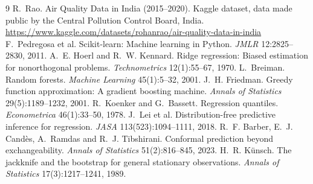 \documentclass{article}
\begin{document}
\begin{thebibliography}{9}
 R.~Rao. Air Quality Data in India (2015--2020). Kaggle dataset, data made public by the Central Pollution Control Board, India. \url{https://www.kaggle.com/datasets/rohanrao/air-quality-data-in-india}
 F.~Pedregosa et al. Scikit-learn: Machine learning in Python. \emph{JMLR} 12:2825--2830, 2011.
 A.~E. Hoerl and R.~W. Kennard. Ridge regression: Biased estimation for nonorthogonal problems. \emph{Technometrics} 12(1):55--67, 1970.
 L.~Breiman. Random forests. \emph{Machine Learning} 45(1):5--32, 2001.
 J.~H. Friedman. Greedy function approximation: A gradient boosting machine. \emph{Annals of Statistics} 29(5):1189--1232, 2001.
 R.~Koenker and G.~Bassett. Regression quantiles. \emph{Econometrica} 46(1):33--50, 1978.
 J.~Lei et al. Distribution-free predictive inference for regression. \emph{JASA} 113(523):1094--1111, 2018.
 R.~F. Barber, E.~J. Cand\`es, A.~Ramdas and R.~J. Tibshirani. Conformal prediction beyond exchangeability. \emph{Annals of Statistics} 51(2):816--845, 2023.
 H.~R. K\"unsch. The jackknife and the bootstrap for general stationary observations. \emph{Annals of Statistics} 17(3):1217--1241, 1989.
\end{thebibliography}
\end{document}
